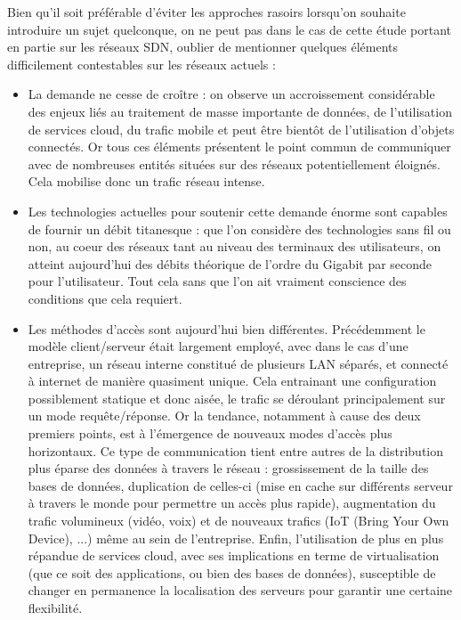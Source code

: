 Bien qu'il soit préférable d'éviter les approches rasoirs lorsqu'on souhaite introduire un sujet quelconque, on ne peut pas dans le cas de cette étude portant en partie sur les réseaux SDN, oublier de mentionner quelques éléments difficilement contestables sur les réseaux actuels :\\

\begin{itemize}

\item La demande ne cesse de croître : on observe un accroissement considérable des enjeux liés au traitement de masse importante de données, de l'utilisation de services cloud, du trafic mobile et peut être bientôt de l'utilisation d'objets connectés. Or tous ces éléments présentent le point commun de communiquer avec de nombreuses entités situées sur des réseaux potentiellement éloignés. Cela mobilise donc un trafic réseau intense.

\item Les technologies actuelles pour soutenir cette demande énorme sont capables de fournir un débit titanesque : que l'on considère des technologies sans fil ou non, au coeur des réseaux tant au niveau des terminaux des utilisateurs, on atteint aujourd'hui des débits théorique de l'ordre du Gigabit par seconde pour l'utilisateur. Tout cela sans que l'on ait vraiment conscience des conditions que cela requiert.

\item Les méthodes d'accès sont aujourd'hui bien différentes. Précédemment le modèle client/serveur était largement employé, avec dans le cas d'une entreprise, un réseau interne constitué de plusieurs LAN séparés, et connecté à internet de manière quasiment unique. Cela entrainant une configuration possiblement statique et donc aisée, le trafic se déroulant principalement sur un mode requête/réponse. Or la tendance, notamment à cause des deux premiers points, est à l'émergence de nouveaux modes d'accès plus horizontaux. Ce type de communication tient entre autres de la distribution plus éparse des données à travers le réseau : grossissement de la taille des bases de données, duplication de celles-ci (mise en cache sur différents serveur à travers le monde pour permettre un accès plus rapide), augmentation du trafic volumineux (vidéo, voix) et de nouveaux trafics (IoT (Bring Your Own Device), ...) même au sein de l'entreprise. Enfin, l'utilisation de plus en plus répandue de services cloud, avec ses implications en terme de virtualisation (que ce soit des applications, ou bien des bases de données), susceptible de changer en permanence la localisation des serveurs pour garantir une certaine flexibilité.

\end{itemize}
~\\

